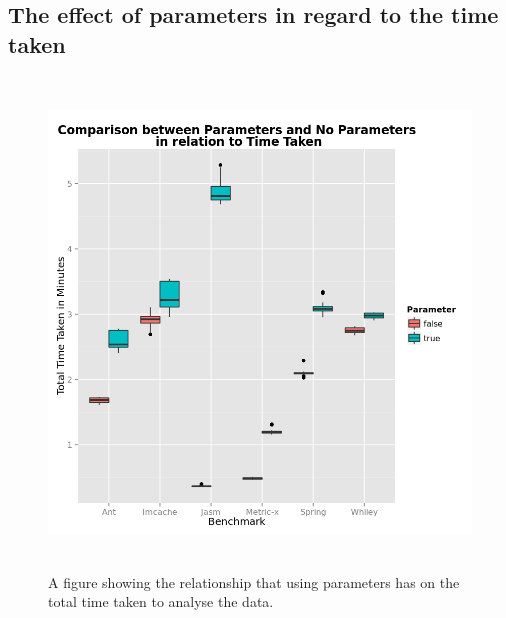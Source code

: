 \begin{appendices}
\chapter{The effect of parameters in regard to the time taken}
\begin{figure}[h]
\centering
\includegraphics[width=\textwidth,height=13cm]{ParamTime.png}
\caption{A figure showing the relationship that using parameters has on the total time taken to analyse the data.}
\label{fig:paramtime}
\end{figure}


\end{appendices}
